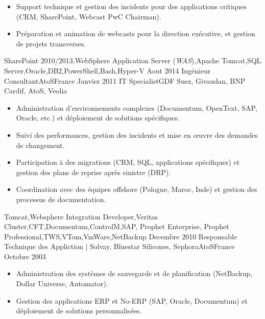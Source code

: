 \begin{experiences}
{\begin{itemize}
                        \item Support technique et gestion des incidents pour des applications critiques (CRM, SharePoint, Webcast PwC Chairman).                   
                        \item Préparation et animation de webcasts pour la direction exécutive, et gestion de projets transverses.                          
                      \end{itemize}
                    }
                    {SharePoint 2010/2013,WebSphere Application Server (\emph{WAS}),Apache Tomcat,SQL Server,Oracle,DB2,PowerShell,Bash,Hyper-V}
  \emptySeparator
  \consultantexperience
  {Aout 2014}       {Ingénieur Consultant}{AtoS}{France}
  {Janvier 2011}   {IT Specialist}{GDF Suez, Givaudan, BNP Cardif, AtoS, Veolia}
                    {
                      \begin{itemize}
                        \item Administration d'environnements complexes (Documentum, OpenText, SAP, Oracle, etc.) et déploiement de solutions spécifiques.
                        \item Suivi des performances, gestion des incidents et mise en œuvre des demandes de changement.
                        \item Participation à des migrations (CRM, SQL, applications spécifiques) et gestion des plans de reprise après sinistre (DRP).
                        \item Coordination avec des équipes offshore (Pologne, Maroc, Inde) et gestion des processus de documentation.
                      \end{itemize}
                    }
                    {Tomcat,Websphere Integration Developer,Veritas Cluster,CFT,Documentum,ControlM,SAP, Prophet Enterprise, Prophet Professional,TWS,VTom,VmWare,NetBackup}
  \emptySeparator         
  \experience
  {Decembre 2010}  {Responsable Technique des Appliction | Solvay, Bluestar Silicones, Sephora}{AtoS}{France}
  {Octobre 2003}   {
                      \begin{itemize}
                        \item Administration des systèmes de sauvegarde et de planification (NetBackup, Dollar Universe, Automator).                                            
                        \item Gestion des applications ERP et No-ERP (SAP, Oracle, Documentum) et déploiement de solutions personnalisées.

\end{itemize}}
\end{experiences}
